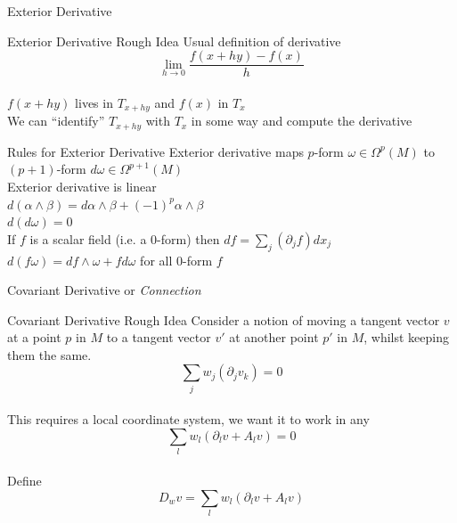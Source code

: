 \documentclass[handout]{beamer}
\begin{document}
  \begin{frame}{Exterior Derivative}
      \linespread{0.7}
      \pause
      \begin{block}{Exterior Derivative Rough Idea}
          Usual definition of derivative
          $$\lim_{h \rightarrow 0}\frac{f(x + hy) - f(x)}{h}$$ \pause \\
          $f(x + hy)$ lives in $T_{x + hy}$ and $f(x)$ in $T_x$ \pause \\
          We can ``identify'' $T_{x+hy}$ with $T_x$ in some way and compute the
          derivative
      \end{block}
      \pause
      \begin{block}{Rules for Exterior Derivative}
          Exterior derivative maps $p$-form $\omega \in \Omega^p(M)$ to
          $(p+1)$-form $d\omega \in \Omega^{p+1}(M)$ \pause \\
          Exterior derivative is linear \pause \\
          $d(\alpha \wedge \beta) = d\alpha \wedge \beta + (-1)^p \alpha \wedge
          \beta$ \pause \\
          $d(d\omega) = 0$ \pause \\
          If $f$ is a scalar field (i.e. a 0-form) then $df = \sum_j
          (\partial_j f)dx_j$ \pause \\
          $d(f\omega) = df \wedge \omega + f d\omega$ for all 0-form $f$
      \end{block}
  \end{frame}
  \begin{frame}{Covariant Derivative or \textit{Connection}}
      \begin{block}{Covariant Derivative Rough Idea}
          Consider a notion of moving a tangent vector $v$ at a point $p$ in
          $M$ to a tangent vector $v'$ at another point $p'$ in $M$, whilst
          keeping them the same. \pause \\
          $$\sum_j w_j (\partial_j v_k) = 0$$ \pause \\
          This requires a local coordinate system, we want it to work in any
          \pause \\
          $$\sum_l w_l(\partial_l v + A_l v) = 0$$ \pause \\
          Define $$D_w v = \sum_l w_l ( \partial_l v + A_l v)$$
      \end{block}
  \end{frame}
\end{document}
